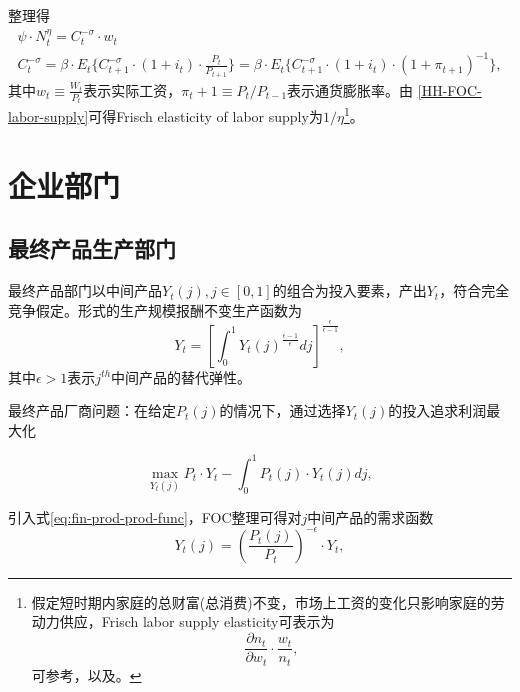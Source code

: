整理得
\begin{gather}
  \label{HH-FOC-labor-supply}
  \psi \cdot N_t^{\eta} = C_t^{-\sigma} \cdot w_t \\
\label{HH-FOC-euler-consumption}
  C_t^{-\sigma} = \beta \cdot E_t\{ C_{t+1}^{-\sigma} \cdot (1+i_t) \cdot \frac{P_t}{P_{t+1}}\}=\beta \cdot E_t\{ C_{t+1}^{-\sigma} \cdot (1+i_t) \cdot ( 1+\pi_{t+1} )^{-1}\},
\end{gather}
其中$w_t \equiv \frac{W_t}{P_t}$表示实际工资，$\pi_t + 1 \equiv P_t/P_{t-1}$表示通货膨胀率。由  \eqref{HH-FOC-labor-supply}可得Frisch elasticity of labor supply为$1/\eta$\footnote{假定短时期内家庭的总财富(总消费)不变，市场上工资的变化只影响家庭的劳动力供应，Frisch labor supply elasticity\citep{Frisch:1932wk,Frisch:1959jt}可表示为
  \begin{equation*}
    \frac{\partial n_t}{\partial w_t} \cdot \frac{w_t}{n_t},
  \end{equation*}
可参考\cite[pp.279]{Heer:2009ig}，以及\cite{Christiano:2010wla}。}。



\section{企业部门}
\label{sec:Basic-NK-model-firm-sector}

\subsection{最终产品生产部门}
\label{sec:Basic-NK-model-final-produc-firm-sector}
最终产品部门以中间产品$Y_t(j), j \in [0,1]$的组合为投入要素，产出$Y_t$，符合完全竞争假定。\cite{Dixit:1977tv}形式的生产规模报酬不变生产函数为
\begin{equation}
  \label{eq:fin-prod-prod-func}
  Y_t = \left[ \int_{0}^{1} Y_t(j)^{\frac{\epsilon - 1}{\epsilon}} dj\right]^{\frac{\epsilon}{\epsilon - 1}},
\end{equation}
其中$\epsilon > 1$表示$j^{th}$中间产品的替代弹性。

最终产品厂商问题：在给定$P_t(j)$的情况下，通过选择$Y_t(j)$的投入追求利润最大化

\begin{equation}
  \label{eq:fin-prod-problem-max}
  \max_{Y_t(j)} P_t \cdot Y_t - \int_{0}^{1} P_t(j) \cdot Y_t(j) dj ,
\end{equation}

引入式\eqref{eq:fin-prod-prod-func}，FOC整理可得对$j$中间产品的需求函数
\begin{equation}
  \label{eq:demand-for-intm-j}
  Y_t(j) = \left( \frac{P_t(j)}{P_t}
\right)^{-\epsilon} \cdot Y_t,
\end{equation}

